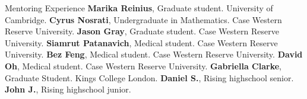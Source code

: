 \begin{rubric}{Mentoring Experience}
\entry*[2021-2022] \textbf{Marika Reinius}, Graduate student. University of Cambridge.
\entry*[2022-2023] \textbf{Cyrus Nosrati}, Undergraduate in Mathematics. Case Western Reserve University.
\entry*[2022-2023] \textbf{Jason Gray}, Graduate student. Case Western Reserve University.
\entry*[2022-2023] \textbf{Siamrut Patanavich}, Medical student. Case Western Reserve University.
\entry*[2022-2023] \textbf{Bez Feng}, Medical student. Case Western Reserve University.
\entry*[2022-2023] \textbf{David Oh}, Medical student. Case Western Reserve University.
\entry*[Summer 2022] \textbf{Gabriella Clarke}, Graduate Student. Kings College London.
\entry*[Summer 2022] \textbf{Daniel S.}, Rising highschool senior.
\entry*[Summer 2023] \textbf{John J.}, Rising highschool junior.
\end{rubric}
